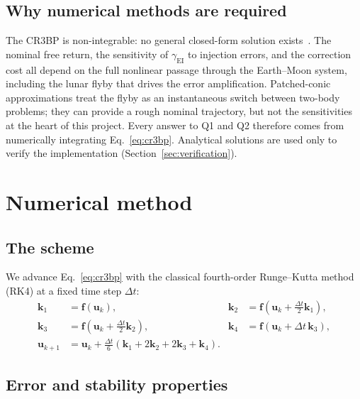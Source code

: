\documentclass[11pt]{article}
\newcommand{\gEI}{\gamma_{\mathrm{EI}}}
\newcommand{\bu}{\mathbf{u}}
\newcommand{\bff}{\mathbf{f}}
\begin{document}
\subsection{Why numerical methods are required}

The CR3BP is non-integrable: no general closed-form solution exists~\cite{szebehely}. The nominal free return, the sensitivity of $\gEI$ to injection errors, and the correction cost all depend on the full nonlinear passage through the Earth--Moon system, including the lunar flyby that drives the error amplification. Patched-conic approximations treat the flyby as an instantaneous switch between two-body problems; they can provide a rough nominal trajectory, but not the sensitivities at the heart of this project. Every answer to Q1 and Q2 therefore comes from numerically integrating Eq.~\eqref{eq:cr3bp}. Analytical solutions are used only to verify the implementation (Section~\ref{sec:verification}).

\section{Numerical method}
\label{sec:method}

\subsection{The scheme}

We advance Eq.~\eqref{eq:cr3bp} with the classical fourth-order Runge--Kutta method (RK4) at a fixed time step $\Delta t$:
\begin{equation}
\label{eq:rk4}
\begin{aligned}
\mathbf{k}_1 &= \bff(\bu_k), &
\mathbf{k}_2 &= \bff\!\left(\bu_k + \tfrac{\Delta t}{2}\mathbf{k}_1\right), \\
\mathbf{k}_3 &= \bff\!\left(\bu_k + \tfrac{\Delta t}{2}\mathbf{k}_2\right), &
\mathbf{k}_4 &= \bff\!\left(\bu_k + \Delta t\,\mathbf{k}_3\right), \\
\bu_{k+1} &= \bu_k + \tfrac{\Delta t}{6}\left(\mathbf{k}_1 + 2\mathbf{k}_2 + 2\mathbf{k}_3 + \mathbf{k}_4\right).
\end{aligned}
\end{equation}

\subsection{Error and stability properties}
\end{document}
